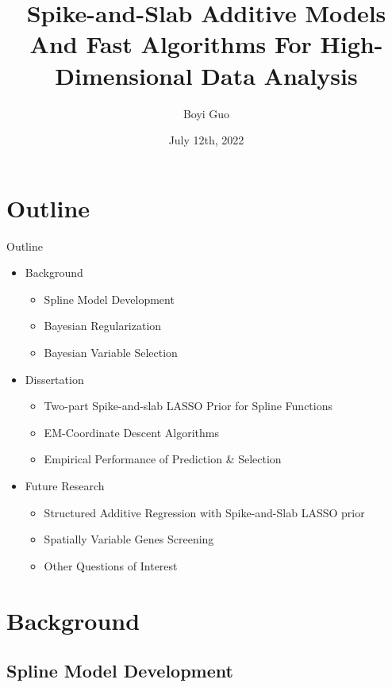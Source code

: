 \documentclass[
  ignorenonframetext,
  aspectratio=169]{beamer}
\title{Spike-and-Slab Additive Models And Fast Algorithms For
High-Dimensional Data Analysis}
\author{Boyi Guo}
\date{July 12th, 2022}
\institute{Department of Biostatistics\\
University of Alabama at Birmingham}
\providecommand{\tightlist}{%
  \setlength{\itemsep}{0pt}\setlength{\parskip}{0pt}}
\begin{document}
\frame{\titlepage}

\hypertarget{outline}{%
\section*{Outline}\label{outline}}

\begin{frame}{Outline}
\begin{itemize}
\tightlist
\item
  Background

  \begin{itemize}
  \tightlist
  \item
    Spline Model Development
  \item
    Bayesian Regularization
  \item
    Bayesian Variable Selection
  \end{itemize}
\item
  Dissertation

  \begin{itemize}
  \tightlist
  \item
    Two-part Spike-and-slab LASSO Prior for Spline Functions
  \item
    EM-Coordinate Descent Algorithms
  \item
    Empirical Performance of Prediction \& Selection
  \end{itemize}
\item
  Future Research

  \begin{itemize}
  \tightlist
  \item
    Structured Additive Regression with Spike-and-Slab LASSO prior
  \item
    Spatially Variable Genes Screening
  \item
    Other Questions of Interest
  \end{itemize}
\end{itemize}
\end{frame}

\hypertarget{background}{%
\section{Background}\label{background}}

\hypertarget{spline-model-development}{%
\subsection{Spline Model Development}\label{spline-model-development}}
\end{document}
